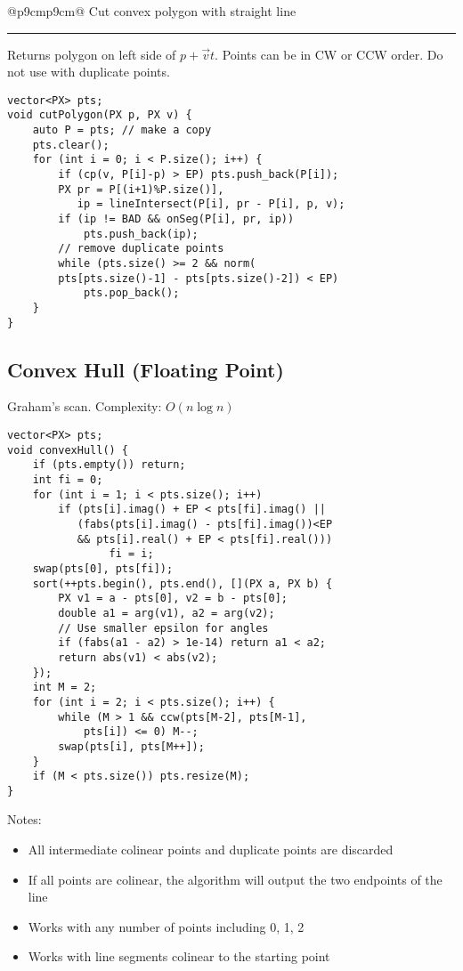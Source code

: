 \documentclass[letterpaper]{article}
\newcommand{\rx}[1]{#1\hrule}
\begin{document}
\clearpage

\begin{tabular}{@{}p{9cm}p{9cm}@{}}
    \rx{Cut convex polygon with straight line}
    \vspace{1mm}
    Returns polygon on left side of $p+\vec vt$. Points can be in CW or CCW order. Do not use with duplicate points.
    \begin{lstlisting}
vector<PX> pts;
void cutPolygon(PX p, PX v) {
	auto P = pts; // make a copy
	pts.clear();
	for (int i = 0; i < P.size(); i++) {
		if (cp(v, P[i]-p) > EP) pts.push_back(P[i]);
		PX pr = P[(i+1)%P.size()],
		   ip = lineIntersect(P[i], pr - P[i], p, v);
		if (ip != BAD && onSeg(P[i], pr, ip))
			pts.push_back(ip);
		// remove duplicate points
		while (pts.size() >= 2 && norm(
		pts[pts.size()-1] - pts[pts.size()-2]) < EP)
			pts.pop_back();
	}
}
\end{lstlisting}

    \subsection{Convex Hull (Floating Point)}
    Graham's scan. Complexity: $O\left(n\log n\right)$

    \begin{lstlisting}
vector<PX> pts;
void convexHull() {
	if (pts.empty()) return;
	int fi = 0;
	for (int i = 1; i < pts.size(); i++)
		if (pts[i].imag() + EP < pts[fi].imag() || 
		   (fabs(pts[i].imag() - pts[fi].imag())<EP
		   && pts[i].real() + EP < pts[fi].real()))
				fi = i;
	swap(pts[0], pts[fi]);
	sort(++pts.begin(), pts.end(), [](PX a, PX b) {
		PX v1 = a - pts[0], v2 = b - pts[0];
		double a1 = arg(v1), a2 = arg(v2);
		// Use smaller epsilon for angles
		if (fabs(a1 - a2) > 1e-14) return a1 < a2;
		return abs(v1) < abs(v2);
	});
	int M = 2;
	for (int i = 2; i < pts.size(); i++) {
		while (M > 1 && ccw(pts[M-2], pts[M-1],
			pts[i]) <= 0) M--;
		swap(pts[i], pts[M++]);
	}
	if (M < pts.size()) pts.resize(M);
}
\end{lstlisting}

    Notes:
    \begin{itemize}
        \item All intermediate colinear points and duplicate points are discarded
        \item If all points are colinear, the algorithm will output the two endpoints of the line
        \item Works with any number of points including 0, 1, 2
        \item Works with line segments colinear to the starting point
    \end{itemize}


\end{tabular}
\end{document}
